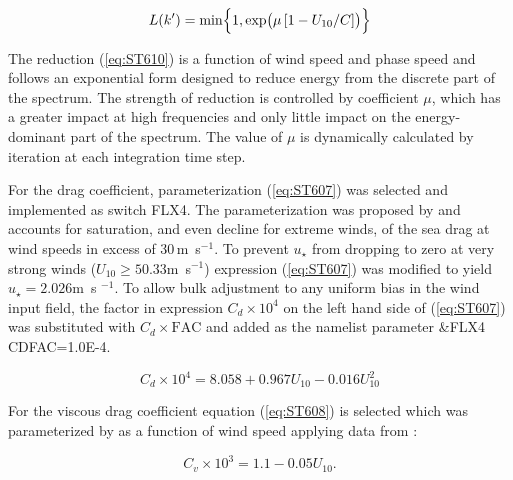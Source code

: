 \begin{equation}\label{eq:ST610}
L(k^\prime) = \min \Bigl \{ 1, \exp \bigl ( \mu\,[1- U_{10}/C] \bigr ) \Bigr \} 
\end{equation}

The reduction (\ref{eq:ST610}) is a function of wind speed and phase speed 
and follows an exponential form designed to reduce energy from the 
discrete part of the spectrum. The strength of reduction is controlled 
by coefficient $\mu$, which has a greater impact at high 
frequencies and only little impact on the energy-dominant part of the 
spectrum. The value of $\mu$ is dynamically calculated by iteration at 
each integration time step.

For the drag coefficient, parameterization (\ref{eq:ST607}) was selected
and implemented as switch {\code FLX4}. The parameterization was proposed by
\citet{art:H11} and accounts for saturation, and even decline 
for extreme winds, of the sea drag at wind speeds in excess of 30\,m~s$^{-1}$. 
To prevent $u_\star$ from dropping to zero at very strong winds
($U_{10}\ge50.33$m~s$^{-1}$) expression (\ref{eq:ST607}) was modified to yield 
$u_\star=2.026$m~s $^{-1}$. To allow bulk adjustment to any uniform
bias in the wind input field, the factor in expression $C_d \times 10^4$ 
on the left hand side of (\ref{eq:ST607}) was substituted with 
$C_d \times \mathrm{FAC}$ and added as the namelist parameter 
{\code \&FLX4 CDFAC=1.0E-4}. 

\begin{equation}\label{eq:ST607}
C_d \times 10^4 = 8.058 + 0.967 U_{10} - 0.016 U_{10}^2 
\end{equation}

For the viscous drag coefficient equation (\ref{eq:ST608}) is selected which was
parameterized by \citet{art:TBWY10} as a function of wind speed applying data from 
\citet{artBP98}:

\begin{equation}\label{eq:ST608}
  C_v \times 10^3 = 1.1 - 0.05 U_{10}.
\end{equation}


